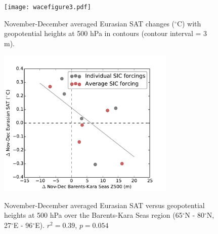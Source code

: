 \documentclass[grl]{AGUTeX}  %
\begin{document}
\begin{article}
\begin{figure}[t]
  \noindent\texttt{[image: wacefigure3.pdf]} \\ 
  \caption{November-December averaged Eurasian SAT changes ($^\circ$C) with geopotential heights at 500 hPa in contours (contour interval = 3 m).
}\label{fig:fig3}
\end{figure} %

\begin{figure}[t]
  \noindent\includegraphics[width=20pc,angle=0]{fig4.pdf} \\ 
  \caption{November-December averaged Eurasian SAT versus geopotential heights at 500 hPa over the Barents-Kara Seas region (65$^\circ$N - 80$^\circ$N, 27$^\circ$E - 96$^\circ$E). $r^2 = 0.39$, $p = 0.054$
}\label{fig:fig4}
\end{figure}





\end{article}
\end{document}
